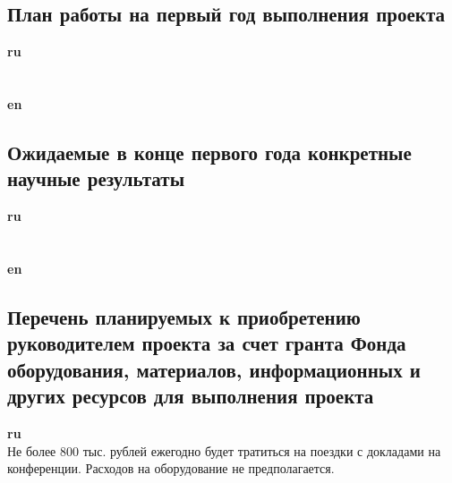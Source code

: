 \documentclass[12pt]{article}  %
\theoremstyle{remark}
\begin{document}
\subsection{План работы на первый год выполнения проекта}

\textbf{ru}\\
%
\\
\\
\textbf{en}\\

\subsection{Ожидаемые в конце первого года конкретные научные результаты}

\textbf{ru}\\
%
\\
\\
\textbf{en}\\

\subsection{Перечень планируемых к приобретению руководителем проекта за счет гранта Фонда оборудования, материалов, информационных и других ресурсов для выполнения проекта}

\textbf{ru}\\
%
Не более 800 тыс. рублей ежегодно будет тратиться на поездки с докладами на конференции. Расходов на оборудование не предполагается.
\end{document}
